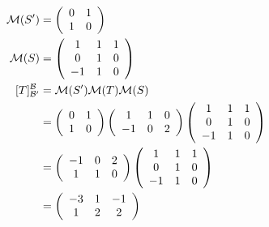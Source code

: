 \documentclass[11pt]{amsart}
\theoremstyle{definition}  %
\begin{document}
\begin{align*}
	\mathcal{M}(S') &= \left( \begin{array}{cc}
		0 & 1\\
		1 & 0
	\end{array} \right)\\
	\mathcal{M}(S) &= \left( \begin{array}{ccc}
		1 & 1 & 1\\
		0 & 1 & 0 \\
		-1 & 1 & 0
	\end{array}\right) \\
	[T]_{\mathcal{B}'}^{\mathcal{B}} &= \mathcal{M}(S')\mathcal{M}(T)\mathcal{M}(S) \\
	&= \left( \begin{array}{cc}
		0 & 1\\
		1 & 0
	\end{array} \right)
	\left ( \begin{array}{ccc}
		1 & 1 & 0 \\
		-1 & 0 & 2
	\end{array}\right )
	\left( \begin{array}{ccc}
		1 & 1 & 1\\
		0 & 1 & 0 \\
		-1 & 1 & 0
	\end{array}\right)\\
	&=\left ( \begin{array}{ccc}
		-1 & 0 & 2 \\
		1 & 1 & 0
	\end{array}\right )
	\left( \begin{array}{ccc}
		1 & 1 & 1\\
		0 & 1 & 0 \\
		-1 & 1 & 0
	\end{array}\right)\\
	&=\left( \begin{array}{ccc}
		-3 & 1 & -1\\
		1 & 2 & 2 
	\end{array}\right)
\end{align*}
\\
\end{document}
